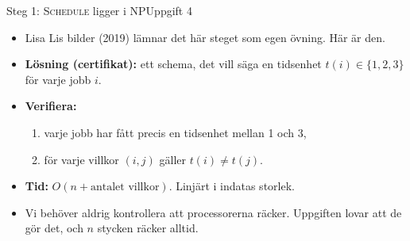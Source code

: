 \documentclass[aspectratio=169,10pt]{beamer}
\newcommand{\prob}[1]{\textsc{#1}}
\begin{document}
\begin{frame}{Steg 1: \prob{Schedule} ligger i NP}{Uppgift 4}
  \begin{itemize}
    \item<1-> Lisa Lis bilder (2019) lämnar det här steget som egen övning. Här är den.
    \item<2-> \textbf{Lösning (certifikat):} ett schema, det vill säga en tidsenhet $t(i)\in\{1,2,3\}$ för varje jobb $i$.
    \item<3-> \textbf{Verifiera:}
      \begin{enumerate}
        \item[a)] varje jobb har fått precis en tidsenhet mellan 1 och 3,
        \item[b)] för varje villkor $(i,j)$ gäller $t(i)\neq t(j)$.
      \end{enumerate}
    \item<4-> \textbf{Tid:} $O(n + \text{antalet villkor})$. Linjärt i indatas storlek.
    \item<5-> Vi behöver aldrig kontrollera att processorerna räcker. Uppgiften lovar att de gör det, och $n$ stycken räcker alltid.
  \end{itemize}
\end{frame}
\end{document}
